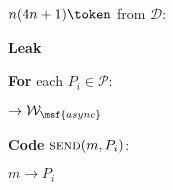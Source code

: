 \begin{bbox}[title={Functionality $\mathcal{F}_\msf{RBC} (\mathcal{D}, \mathcal{P})$}]

\OnInput {} \color{blue} {\bf $n(4n+1) \token$} \color{Black} from $\mathcal{D}$:

	\begin{renumerate}

		\item {\bf Leak} 
		
		\item {\bf For} each $P_i \in \mathcal{P}$:
		\begin{renumerate}

			\item \Send {} $\rightarrow \mathcal{W}_\msf{async}$		

		\end{renumerate}
	\end{renumerate}

{\bf Code} $\textsc{send}(m, P_i)$:
	\begin{renumerate}

		\item \Send $m \rightarrow P_i$
	\end{renumerate}
\end{bbox}
